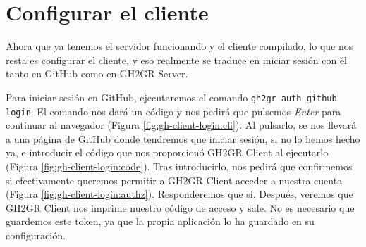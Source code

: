 \section{Configurar el cliente}
Ahora que ya tenemos el servidor funcionando y el cliente compilado, lo que nos resta es configurar el cliente, y eso realmente se traduce en iniciar sesión con él tanto en GitHub como en GH2GR Server.

Para iniciar sesión en GitHub, ejecutaremos el comando \texttt{gh2gr auth github login}. El comando nos dará un código y nos pedirá que pulsemos \textit{Enter} para continuar al navegador (Figura \ref{fig:gh-client-login:cli}). Al pulsarlo, se nos llevará a una página de GitHub donde tendremos que iniciar sesión, si no lo hemos hecho ya, e introducir el código que nos proporcionó GH2GR Client al ejecutarlo (Figura \ref{fig:gh-client-login:code}). Tras introducirlo, nos pedirá que confirmemos si efectivamente queremos permitir a GH2GR Client acceder a nuestra cuenta (Figura \ref{fig:gh-client-login:authz}). Responderemos que sí. Después, veremos que GH2GR Client nos imprime nuestro código de acceso y sale. No es necesario que guardemos este token, ya que la propia aplicación lo ha guardado en su configuración.

